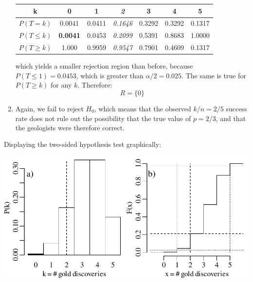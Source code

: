 \begin{enumerate}
  \begin{center}
    \begin{tabular}{ccccccc}
      k & \textbf{0} & 1 & \textit{2} & 3 & 4 & 5 \\ \hline
      $P(T=k)$ & 0.0041 & 0.0411 & \textit{0.1646} & 0.3292 & 0.3292 & 0.1317 \\
      $P({T}\leq{k})$ & \textbf{0.0041} & 0.0453 &
      \textit{0.2099} & 0.5391 & 0.8683 & 1.0000 \\
      $P({T}\geq{k})$ & 1.000 & 0.9959 & \textit{0.9547} & 0.7901 & 0.4609 & 0.1317
    \end{tabular}
  \end{center}

  \noindent which yields a smaller rejection region than before,
  because $P(T\leq{1})=0.0453$, which is greater than
  $\alpha/2=0.025$.  The same is true for $P(T\geq{k})$ for any
  $k$. Therefore:
  \[
  R = \{0\}
  \]

\item Again, we fail to reject $H_0$, which means that the
  observed $k/n=2/5$ success rate does not rule out the possibility
  that the true value of $p=2/3$, and that the geologists were
  therefore correct.
  
\end{enumerate}

Displaying the two-sided hypothesis test graphically:\medskip

\noindent\begin{minipage}[t][][b]{.6\textwidth}
\includegraphics[width=\textwidth]{../figures/2sidedbinomialrejection5.pdf}
\medskip
\end{minipage}
\begin{minipage}[t][][t]{.4\textwidth}
  \label{fig:2sidedbinomialrejection5}
\end{minipage}

